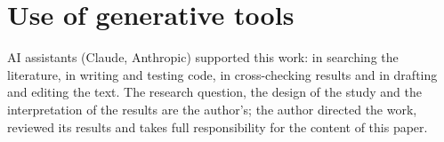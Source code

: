 \documentclass[a4paper,fleqn]{cas-dc}
\begin{document}
\section*{Use of generative tools}
AI assistants (Claude, Anthropic) supported this work: in searching the literature, in writing and testing code, in cross-checking results and in drafting and editing the text. The research question, the design of the study and the interpretation of the results are the author's; the author directed the work, reviewed its results and takes full responsibility for the content of this paper.



\end{document}
